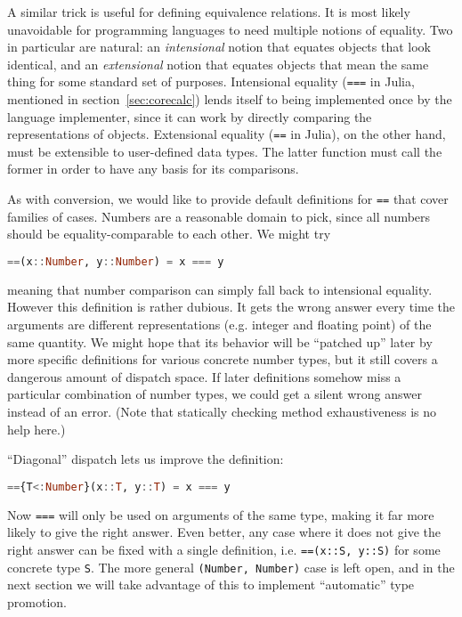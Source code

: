 A similar trick is useful for defining equivalence relations.
It is most likely unavoidable for programming languages to need multiple
notions of equality. Two in particular are natural: an \emph{intensional}
notion that equates objects that look identical, and an \emph{extensional}
notion that equates objects that mean the same thing for some standard
set of purposes. Intensional equality (\texttt{===} in Julia, mentioned
in section~\ref{sec:corecalc}) lends itself to being implemented once
by the language implementer, since it can work by directly comparing
the representations of objects. Extensional equality (\texttt{==} in
Julia), on the other hand, must be extensible to user-defined data types.
The latter function must call the former in order to have any basis for
its comparisons.

As with conversion, we would like to provide default definitions for
\texttt{==} that cover families of cases. Numbers are a reasonable
domain to pick, since all numbers should be equality-comparable to each
other. We might try

\begin{singlespace}
\begin{lstlisting}[language=julia]
==(x::Number, y::Number) = x === y
\end{lstlisting}
\end{singlespace}

\noindent
meaning that number comparison can simply fall back to intensional
equality. However this definition is rather dubious. It gets the wrong
answer every time the arguments are different representations (e.g.
integer and floating point) of the same quantity. We might hope that
its behavior will be ``patched up'' later by more specific definitions
for various concrete number types, but it still covers a dangerous
amount of dispatch space. If later definitions somehow miss a particular
combination of number types, we could get a silent wrong answer instead
of an error. (Note that statically checking method exhaustiveness is no
help here.)

``Diagonal'' dispatch lets us improve the definition:

\begin{singlespace}
\begin{lstlisting}[language=julia]
=={T<:Number}(x::T, y::T) = x === y
\end{lstlisting}
\end{singlespace}

\noindent
Now \texttt{===} will only be used on arguments of the same type,
making it far more likely to give the right answer. Even better,
any case where it does not give the right answer can be fixed with
a single definition, i.e. \texttt{==(x::S, y::S)} for some
concrete type \texttt{S}. The more general \texttt{(Number, Number)}
case is left open, and in the next section we will take advantage
of this to implement ``automatic'' type promotion.

